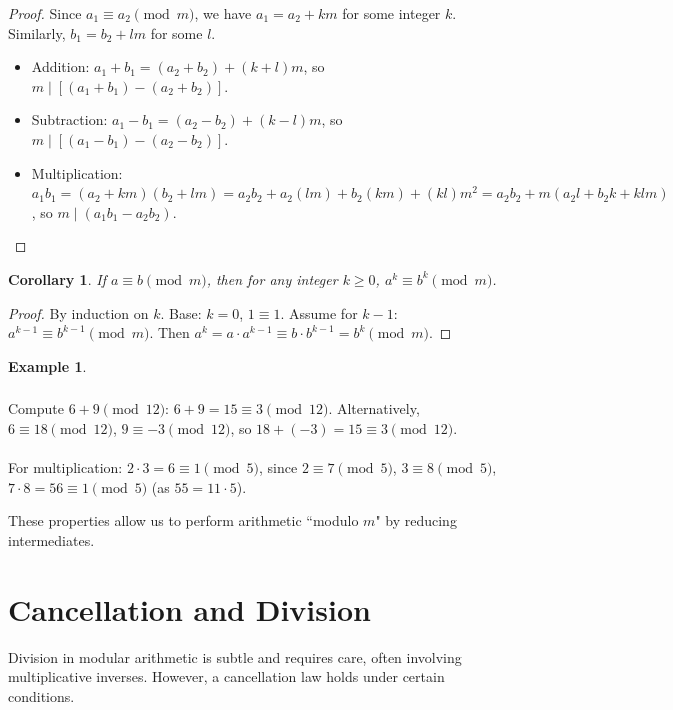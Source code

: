 \documentclass[12pt,openany]{book}
\theoremstyle{definition}
\newtheorem{example}{Example}[chapter]
\theoremstyle{plain}
\newtheorem{corollary}{Corollary}[chapter]
\theoremstyle{remark}
\begin{document}
\begin{proof}
  Since $a_1 \equiv a_2 \pmod{m}$, we have $a_1 = a_2 + k m$ for some integer $k$. Similarly, $b_1 = b_2 + l m$ for some $l$.
  \begin{itemize}
    \item Addition: $a_1 + b_1 = (a_2 + b_2) + (k + l) m$, so $m \mid [(a_1 + b_1) - (a_2 + b_2)]$.
    \item Subtraction: $a_1 - b_1 = (a_2 - b_2) + (k - l) m$, so $m \mid [(a_1 - b_1) - (a_2 - b_2)]$.
    \item Multiplication: $a_1 b_1 = (a_2 + k m)(b_2 + l m) = a_2 b_2 + a_2 (l m) + b_2 (k m) + (k l) m^2 = a_2 b_2 + m (a_2 l + b_2 k + k l m)$, so $m \mid (a_1 b_1 - a_2 b_2)$.
  \end{itemize}
\end{proof}

\begin{corollary}
  If $a \equiv b \pmod{m}$, then for any integer $k \geq 0$, $a^k \equiv b^k \pmod{m}$.
\end{corollary}

\begin{proof}
  By induction on $k$. Base: $k=0$, $1 \equiv 1$. Assume for $k-1$: $a^{k-1} \equiv b^{k-1} \pmod{m}$. Then $a^k = a \cdot a^{k-1} \equiv b \cdot b^{k-1} = b^k \pmod{m}$.
\end{proof}

\begin{example}\subsubsection*{}
  Compute $6 + 9 \pmod{12}$: $6 + 9 = 15 \equiv 3 \pmod{12}$. Alternatively, $6 \equiv 18 \pmod{12}$, $9 \equiv -3 \pmod{12}$, so $18 + (-3) = 15 \equiv 3 \pmod{12}$.
\noindent
\\ \\
  For multiplication: $2 \cdot 3 = 6 \equiv 1 \pmod{5}$, since $2 \equiv 7 \pmod{5}$, $3 \equiv 8 \pmod{5}$, $7 \cdot 8 = 56 \equiv 1 \pmod{5}$ (as $55 = 11 \cdot 5$).
\end{example}
\noindent
These properties allow us to perform arithmetic ``modulo $m$" by reducing intermediates.

\section{Cancellation and Division}

Division in modular arithmetic is subtle and requires care, often involving multiplicative inverses. However, a cancellation law holds under certain conditions.
\end{document}
